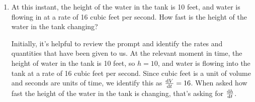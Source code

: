 \documentclass[main]{subfiles}
\begin{document}
\begin{enumerate}[resume]
\begin{enumerate}
\begin{solution}
      We start by drawing a picture and labeling important quantities.
      \begin{center} 
      \end{center} 

      Let $h$ be the height of the water and $r$ be the radius of the
      surface area of the water.  By similar triangles, $\frac{r}{h} =
      \frac{8}{40} = \frac{1}{5}$.  So, $h = 5r$ or $\frac{h}{5}=r$.
    \end{solution}

    \item
    \begin{problem}[\stretch{2}]
        At this instant, the height of the water in the tank is 10 feet, and water is flowing in at a rate of 16 cubic feet per second. How fast is the height of the water in the tank changing?
    \end{problem}

    \begin{solution}
        Initially, it's helpful to review the prompt and identify the rates and quantities that have been given to us. At the relevant moment in time, the height of water in the tank is 10 feet, so $h=10$, and water is flowing into the tank at a rate of 16 cubic feet per second. Since cubic feet is a unit of volume and seconds are units of time, we identify this as $\diff{V}{t}=16$. When asked how fast the height of the water in the tank is changing, that's asking for $\diff{h}{t}$. 


\end{solution}
\end{enumerate}
\end{enumerate}
\end{document}
